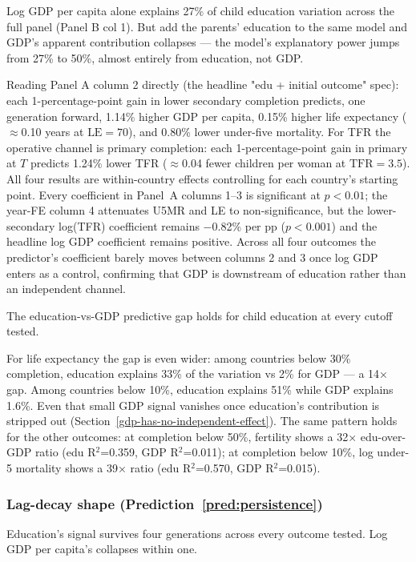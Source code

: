 \documentclass[12pt,letterpaper]{article}
\begin{document}
Log GDP per capita alone explains 27\% of child education variation across the
full panel (Panel B col 1). But add the parents' education to the same
model and GDP's apparent contribution collapses --- the
model's explanatory power jumps from 27\% to 50\%, almost entirely from
education, not GDP.

Reading Panel A column 2 directly (the headline "edu + initial outcome"
spec): each 1-percentage-point gain in lower secondary completion
predicts, one generation forward, 1.14\% higher GDP per capita,
0.15\% higher life expectancy ($\approx$0.10 years at $\text{LE}=70$),
and 0.80\% lower under-five mortality. For TFR the operative channel
is primary completion: each 1-percentage-point gain in primary at $T$
predicts 1.24\% lower TFR ($\approx$0.04 fewer children per woman at
$\text{TFR}=3.5$). All four results are within-country effects
controlling for each country's starting point.
Every coefficient in Panel~A columns 1--3 is significant at $p<0.01$;
the year-FE column 4 attenuates U5MR and LE to non-significance, but
the lower-secondary log(TFR) coefficient remains $-$0.82\% per pp
($p<0.001$) and the headline log GDP coefficient remains positive.
Across all four outcomes the predictor's coefficient barely moves
between columns 2 and 3 once log GDP enters as a control, confirming
that GDP is downstream of education rather than an independent
channel.

The education-vs-GDP predictive gap holds for child education at every
cutoff tested.

For life expectancy the gap is even wider: among countries below 30\%
completion, education explains 33\% of the variation vs 2\% for GDP ---
a 14× gap. Among countries below 10\%, education explains 51\% while
GDP explains 1.6\%. Even that small GDP signal vanishes once education's
contribution is stripped out
(Section~\ref{gdp-has-no-independent-effect}). The same pattern holds
for the other outcomes: at completion below 50\%, fertility shows a
32× edu-over-GDP ratio (edu R$^2$=0.359, GDP R$^2$=0.011); at
completion below 10\%, log under-5 mortality shows a 39× ratio (edu
R$^2$=0.570, GDP R$^2$=0.015).

\subsubsection*{Lag-decay shape (Prediction~\ref{pred:persistence})}

Education's signal survives four generations across every outcome
tested. Log GDP per capita's collapses within one.
\end{document}
